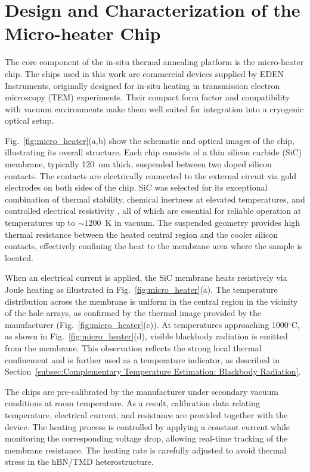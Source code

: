 \section{Design and Characterization of the Micro-heater Chip}
\label{sec:Design and Characterization of the Micro-heater Chip}

The core component of the in-situ thermal annealing platform is the micro-heater chip. The chips used in this work are commercial devices supplied by EDEN Instruments, originally designed for in-situ heating in transmission electron microscopy (TEM) experiments. Their compact form factor and compatibility with vacuum environments make them well suited for integration into a cryogenic optical setup.

Fig.~\ref{fig:micro_heater}(a,b) show the schematic and optical images of the chip, illustrating its overall structure. Each chip consists of a thin silicon carbide (SiC) membrane, typically 120~nm thick, suspended between two doped silicon contacts. The contacts are electrically connected to the external circuit via gold electrodes on both sides of the chip. SiC was selected for its exceptional combination of thermal stability, chemical inertness at elevated temperatures, and controlled electrical resistivity \cite{casady-1996,kimoto-2022}, all of which are essential for reliable operation at temperatures up to $\sim 1200$~K in vacuum. The suspended geometry provides high thermal resistance between the heated central region and the cooler silicon contacts, effectively confining the heat to the membrane area where the sample is located.

When an electrical current is applied, the SiC membrane heats resistively via Joule heating as illustrated in Fig.~\ref{fig:micro_heater}(a). The temperature distribution across the membrane is uniform in the central region in the vicinity of the hole arrays, as confirmed by the thermal image provided by the manufacturer (Fig.~\ref{fig:micro_heater}(c)). At temperatures approaching 1000$^\circ$C, as shown in Fig.~\ref{fig:micro_heater}(d), visible blackbody radiation is emitted from the membrane. This observation reflects the strong local thermal confinement and is further used as a temperature indicator, as described in Section~\ref{subsec:Complementary Temperature Estimation: Blackbody Radiation}.

The chips are pre-calibrated by the manufacturer under secondary vacuum conditions at room temperature. As a result, calibration data relating temperature, electrical current, and resistance are provided together with the device. The heating process is controlled by applying a constant current while monitoring the corresponding voltage drop, allowing real-time tracking of the membrane resistance. The heating rate is carefully adjusted to avoid thermal stress in the hBN/TMD heterostructure.


